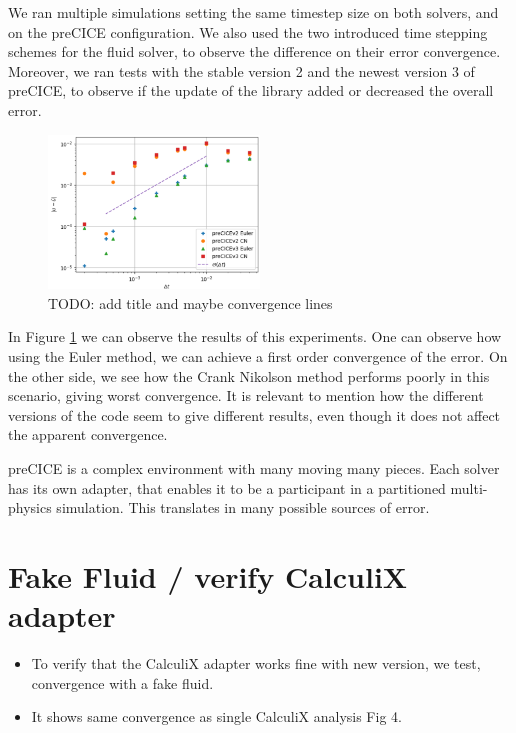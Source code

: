 \documentclass[
  english,        %
  font=times,     %
  onecolumn,      %
]{tumarticle}
\begin{document}
We ran multiple simulations setting the same timestep size on both solvers, and on the preCICE configuration. We also used the two introduced time stepping schemes for the fluid solver, to observe the difference on their error convergence. Moreover, we ran tests with the stable version 2 and the newest version 3 of preCICE, to observe if the update of the library added or decreased the overall error. 
\begin{figure}[!ht]
    \centering
    \includegraphics[width=0.5\textwidth]{resources/coupled_v2_v3_results.png}
    \caption{TODO: add title and maybe convergence lines}
    \label{fig:coupled_v2_v3}
\end{figure}
In Figure \ref{fig:coupled_v2_v3} we can observe the results of this experiments. One can observe how using the Euler method, we can achieve a first order convergence of the error. On the other side, we see how the Crank Nikolson method performs poorly in this scenario, giving worst convergence. It is relevant to mention how the different versions of the code seem to give different results, even though it does not affect the apparent convergence.  

preCICE is a complex environment with many moving many pieces. Each solver has its own adapter, that enables it to be a participant in a partitioned multi-physics simulation. This translates in many possible sources of error.





\section{Fake Fluid / verify CalculiX adapter}

\begin{itemize}
    \item To verify that the CalculiX adapter works fine with new version, we test, convergence with a fake fluid.
    \item It shows same convergence as single CalculiX analysis Fig 4. 
\end{itemize}
\end{document}
